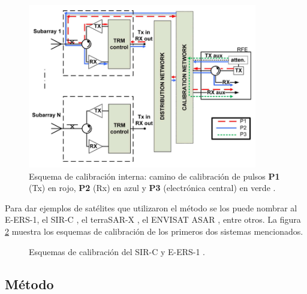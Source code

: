 \begin{figure}[H]
 \centering
 \includegraphics[width=10cm]{gfx/classic_cal_scheme.png}
 \caption{Esquema de calibración interna: camino de calibración de pulsos \textbf{P1} (Tx) en rojo, \textbf{P2} (Rx) en azul
 y \textbf{P3} (electrónica central) en verde \cite{Makhoul2012}.}
 \label{fig:classic_cal_scheme}
\end{figure}

Para dar ejemplos de satélites que utilizaron el método se los puede nombrar al E-ERS-1, el SIR-C \cite{Curlander1991}, el
terraSAR-X \cite{Schwerdt2005}, el ENVISAT ASAR \cite{Loop}, entre otros. La figura \ref{fig:calibrMethods} muestra los esquemas
de calibración de los primeros dos sistemas mencionados.

\begin{figure}[H]
	\centering
	\caption{Esquemas de calibración del SIR-C y E-ERS-1 \cite{Curlander1991}.}
	\label{fig:calibrMethods}
\end{figure}


\subsection{Método} \label{ssc:classicalMethod}

